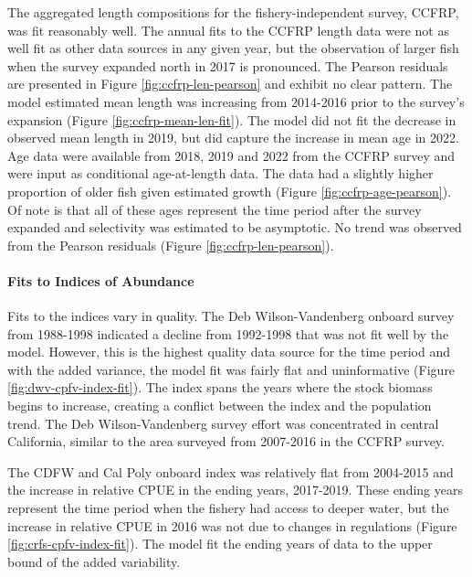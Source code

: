 \documentclass[11pt,
  letterpaper,
]{article}
\begin{document}
The aggregated length compositions for the fishery-independent survey, CCFRP, was fit reasonably well. The annual fits to the CCFRP length data were not as well fit as other data sources in any given year, but the observation of larger fish when the survey expanded north in 2017 is pronounced. The Pearson residuals are presented in Figure \ref{fig:ccfrp-len-pearson} and exhibit no clear pattern. The model estimated mean length was increasing from 2014-2016 prior to the survey's expansion (Figure \ref{fig:ccfrp-mean-len-fit}). The model did not fit the decrease in observed mean length in 2019, but did capture the increase in mean age in 2022. Age data were available from 2018, 2019 and 2022 from the CCFRP survey and were input as conditional age-at-length data. The data had a slightly higher proportion of older fish given estimated growth (Figure \ref{fig:ccfrp-age-pearson}). Of note is that all of these ages represent the time period after the survey expanded and selectivity was estimated to be asymptotic. No trend was observed from the Pearson residuals (Figure \ref{fig:ccfrp-len-pearson}).

\paragraph{Fits to Indices of Abundance}\label{fits-to-indices-of-abundance}

\hfill\break

Fits to the indices vary in quality. The Deb Wilson-Vandenberg onboard survey from 1988-1998 indicated a decline from 1992-1998 that was not fit well by the model. However, this is the highest quality data source for the time period and with the added variance, the model fit was fairly flat and uninformative (Figure \ref{fig:dwv-cpfv-index-fit}). The index spans the years where the stock biomass begins to increase, creating a conflict between the index and the population trend. The Deb Wilson-Vandenberg survey effort was concentrated in central California, similar to the area surveyed from 2007-2016 in the CCFRP survey.

The CDFW and Cal Poly onboard index was relatively flat from 2004-2015 and the increase in relative CPUE in the ending years, 2017-2019. These ending years represent the time period when the fishery had access to deeper water, but the increase in relative CPUE in 2016 was not due to changes in regulations (Figure \ref{fig:crfs-cpfv-index-fit}). The model fit the ending years of data to the upper bound of the added variability.
\end{document}
